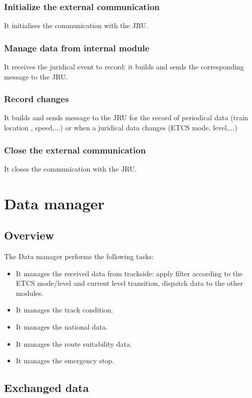 \documentclass[nocc]{template/openetcs_report}
\begin{document}
\subsection{Initialize the external communication}
It initialises the communication with the JRU.
\subsection{Manage data from internal module}
It receives the juridical event to record: it builds and sends the corresponding message to the JRU.
\subsection{Record changes}
It builds and sends message to the JRU for the record of periodical data (train location , speed,...) or when a juridical data changes (ETCS mode, level,...)
\subsection{Close the external communication}
It closes the communication with the JRU.
\chapter{Data manager}
\section{Overview}
The Data manager performs the following tasks:
\begin{itemize}
\item	It manages the received data from trackside: apply filter according to the ETCS mode/level and current level transition, dispatch data to the other modules.
\item	It manages the track condition.
\item It manages the national data.
\item	It manages the route suitability data.
\item	It manages the emergency stop.
\end{itemize}

\section{Exchanged data}
\end{document}
